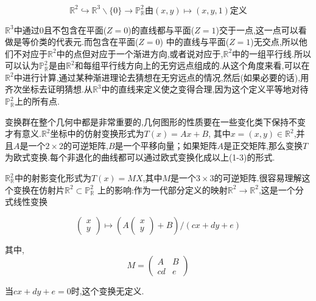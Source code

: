 \documentclass[UTF8]{book}
\begin{document}
		\vspace{-9mm}
		\begin{equation*}
		\mathbb{R}^{2} \hookrightarrow \mathbb{R}^{3} \backslash\{0\} \rightarrow \mathbb{P}^{2}_{\mathbb{R}} \text{由}(x, y) \mapsto(x, y, 1) \text{定义}
		\end{equation*}
		\vspace{5mm}
	
		$\mathbb{R}^{3}$中通过$ 0 $且不包含在平面($ Z=0 $)的直线都与平面($ Z=1 $)交于一点,这一点可以看做是等价类的代表元.而包含在平面($ Z=0 $) 中的直线与平面($ Z=1 $)无交点,所以他们不对应于$\mathbb{R}^{2}$中的点但对应于一个渐进方向,或者说对应于,$\mathbb{R}^{2}$中的一组平行线.所以可以认为$\mathbb{P}^{2}_{	\mathbb{R}}$是由$\mathbb{R}^{2}$和每组平行线方向上的无穷远点组成的.从这个角度来看,可以在$\mathbb{R}^{2}$中进行计算,通过某种渐进理论去猜想在无穷远点的情况,然后(如果必要的话),用齐次坐标去证明猜想.从$\mathbb{R}^{3}$中的直线来定义使之变得合理,因为这个定义平等地对待$\mathbb{P}^{2}_{\mathbb{R}}$上的所有点.
		
		
		变换群在整个几何中都是非常重要的,几何图形的性质要在一些变化类下保持不变才有意义.$\mathbb{R}^{2}$坐标中的仿射变换形式为$ T(x)=Ax+B $, 其中$x=(x,y)\in \mathbb{R}^{2}$,并且$ A $是一个$2\times2$的可逆矩阵,$ B $是一个平移向量；如果矩阵$ A $是正交矩阵,那么变换$ T $为欧式变换.每个非退化的曲线都可以通过欧式变换化成以上(1-3)的形式.
		
		
		$\mathbb{R}^{2}_{\mathbb{R}}$中的射影变化形式为$ T(x)=MX $,其中$ M $是一个$3\times3$的可逆矩阵.很容易理解这个变换在仿射片$\mathbb{R}^{2} \subset \mathbb{P}^{2}_{\mathbb{R}}$ 上的影响:作为一代部分定义的映射$\mathbb{R}^{2}\rightarrow \mathbb{R}^{2}$,这是一个分式线性变换
		
		\begin{equation*}
		\begin{pmatrix} x \\ y  \end{pmatrix}
		\mapsto (A\begin{pmatrix} x \\ y\end{pmatrix}+B)/(cx+dy+e)
		\end{equation*}
	
		其中,
		\begin{equation*}
		M=\begin{pmatrix} A  & B \\ c  d &e\end{pmatrix}
		\end{equation*}
	
		当$ cx+dy+e=0 $时,这个变换无定义.
\end{document}
